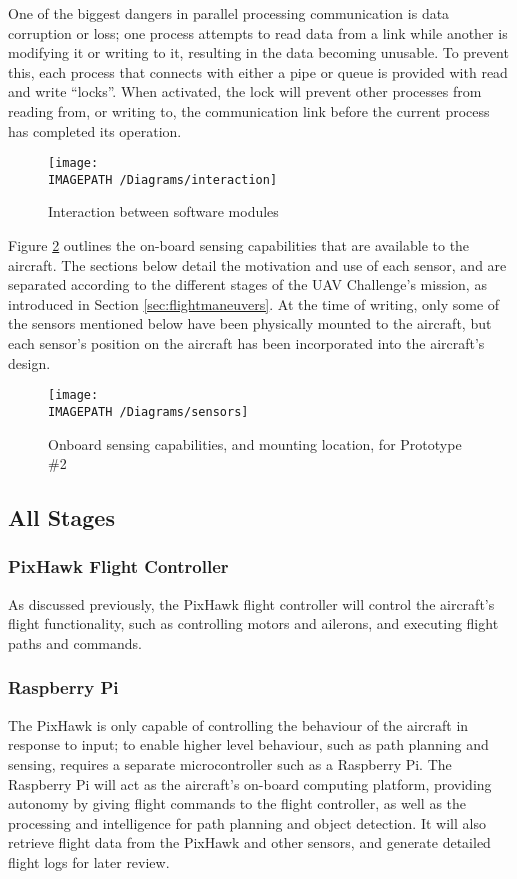 One of the biggest dangers in parallel processing communication is data corruption or loss; one process attempts to read data from a link while another is modifying it or writing to it, resulting in the data becoming unusable. To prevent this, each process that connects with either a pipe or queue is provided with read and write ``locks''. When activated, the lock will prevent other processes from reading from, or writing to, the communication link before the current process has completed its operation.

\begin{figure}[H]
	\centering
	\texttt{[image: \\IMAGEPATH /Diagrams/interaction]}
	\caption{Interaction between software modules}
	\label{fig:softwareinteraction-exec}
\end{figure}

Figure \ref{fig:sensing-exec} outlines the on-board sensing capabilities that are available to the aircraft. The sections below detail the motivation and use of each sensor, and are separated according to the different stages of the UAV Challenge's mission, as introduced in Section \ref{sec:flightmaneuvers}. At the time of writing, only some of the sensors mentioned below have been physically mounted to the aircraft, but each sensor's position on the aircraft has been incorporated into the aircraft's design.

\begin{figure}[!ht]
	\centering
	\texttt{[image: \\IMAGEPATH /Diagrams/sensors]}
	\caption{Onboard sensing capabilities, and mounting location, for Prototype \#2}
	\label{fig:sensing-exec}
\end{figure}

\subsection{All Stages}

\subsubsection*{PixHawk Flight Controller}
As discussed previously, the PixHawk flight controller will control the aircraft's flight functionality, such as controlling motors and ailerons, and executing flight paths and commands.

\subsubsection*{Raspberry Pi}
The PixHawk is only capable of controlling the behaviour of the aircraft in response to input; to enable higher level behaviour, such as path planning and sensing, requires a separate microcontroller such as a Raspberry Pi. The Raspberry Pi will act as the aircraft's on-board computing platform, providing autonomy by giving flight commands to the flight controller, as well as the processing and intelligence for path planning and object detection. It will also retrieve flight data from the PixHawk and other sensors, and generate detailed flight logs for later review.

